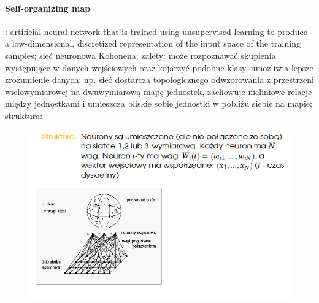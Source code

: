 \documentclass[10pt,a4paper]{article}
\begin{document}
\paragraph{Self-organizing map}: artificial neural network that is trained using unsupervised learning to produce a low-dimensional, discretized representation of the input space of the training samples; sieć neuronowa Kohonena; zalety: może rozpoznawać skupienia występujące w danych wejściowych oraz kojarzyć podobne klasy, umożliwia lepsze zrozumienie danych; np. sieć dostarcza topologicznego odwzorowania z przestrzeni wielowymiarowej na dwuwymiarową mapę jednostek, zachowuje nieliniowe relacje między jednostkami i umieszcza bliskie sobie jednostki w pobliżu siebie na mapie; struktura:
\begin{figure}[H]
  \centering
    \includegraphics[scale=0.50]{images/som.png}
\end{figure}
\end{document}
